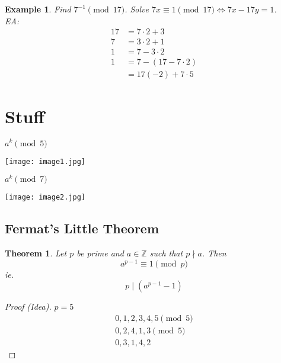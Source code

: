 \documentclass[letterpaper]{article}
\newcommand{\ZZ}{\mathbb{Z}}
\newtheorem{theorem}{Theorem}[section]
\newtheorem{example}{Example}[theorem]
\begin{document}
    \begin{example}
        Find $7^{-1}\pmod{17}$. 
        Solve $7x\equiv 1\pmod{17} \Leftrightarrow 7x-17y=1$. \\
        EA:
        \begin{align*}
            17 &= 7\cdot 2 + 3 \\
            7 &= 3\cdot 2 + 1 \\
            1 &= 7-3\cdot 2 \\ 
            1 &= 7-(17-7\cdot 2) \\
            &= 17(-2)+7\cdot 5
        \end{align*}
        \begin{center}\end{center}
    \end{example}

\section{Stuff}
    $a^k\pmod{5}$  \\
    \begin{center}\texttt{[image: image1.jpg]}\end{center}
    $a^k\pmod{7}$ \\
    \begin{center}\texttt{[image: image2.jpg]}\end{center}

    \subsection{Fermat's Little Theorem}
        \begin{theorem}
            Let $p$ be prime and $a\in\ZZ$ such that $p\nmid a$. Then
            \[
                a^{p-1}\equiv 1\pmod{p}
            \]
            ie.
            \[ 
                p\mid (a^{p-1}-1)
            \]
        \end{theorem}

        \begin{proof} [Proof (Idea)]
            $p=5$ 
            \begin{align*}
                0,1,2,3,4,5 \pmod{5} \\
                0,2,4,1,3 \pmod{5} \\
                0,3,1,4,2
            \end{align*}
        \end{proof}
\end{document}
